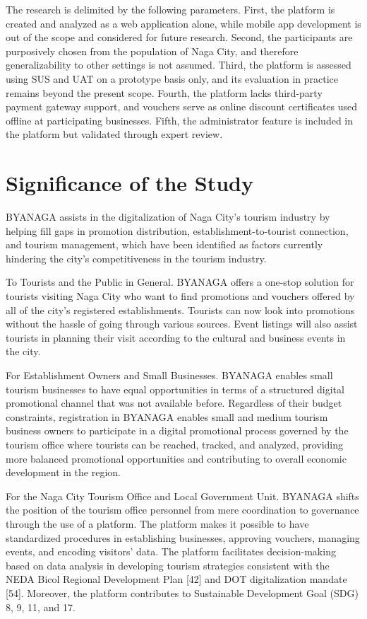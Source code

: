 \documentclass{research}
\begin{document}
The research is delimited by the following parameters. First, the platform is created and analyzed as a web application alone, while mobile app development is out of the scope and considered for future research. Second, the participants are purposively chosen from the population of Naga City, and therefore generalizability to other settings is not assumed. Third, the platform is assessed using SUS and UAT on a prototype basis only, and its evaluation in practice remains beyond the present scope. Fourth, the platform lacks third-party payment gateway support, and vouchers serve as online discount certificates used offline at participating businesses. Fifth, the administrator feature is included in the platform but validated through expert review.

\section{Significance of the Study}

BYANAGA assists in the digitalization of Naga City’s tourism industry by helping fill gaps in promotion distribution, establishment-to-tourist connection, and tourism management, which have been identified as factors currently hindering the city’s competitiveness in the tourism industry.

To Tourists and the Public in General. BYANAGA offers a one-stop solution for tourists visiting Naga City who want to find promotions and vouchers offered by all of the city’s registered establishments. Tourists can now look into promotions without the hassle of going through various sources. Event listings will also assist tourists in planning their visit according to the cultural and business events in the city.

For Establishment Owners and Small Businesses. BYANAGA enables small tourism businesses to have equal opportunities in terms of a structured digital promotional channel that was not available before. Regardless of their budget constraints, registration in BYANAGA enables small and medium tourism business owners to participate in a digital promotional process governed by the tourism office where tourists can be reached, tracked, and analyzed, providing more balanced promotional opportunities and contributing to overall economic development in the region.

For the Naga City Tourism Office and Local Government Unit. BYANAGA shifts the position of the tourism office personnel from mere coordination to governance through the use of a platform. The platform makes it possible to have standardized procedures in establishing businesses, approving vouchers, managing events, and encoding visitors' data. The platform facilitates decision-making based on data analysis in developing tourism strategies consistent with the NEDA Bicol Regional Development Plan [42] and DOT digitalization mandate [54]. Moreover, the platform contributes to Sustainable Development Goal (SDG) 8, 9, 11, and 17.
\end{document}
